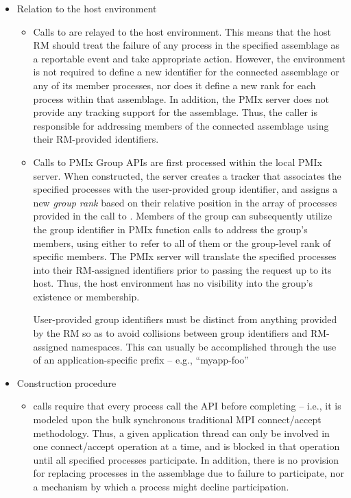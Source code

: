 \begin{itemize}
    \item Relation to the host environment
    \begin{itemize}
        \item Calls to  are relayed to the host environment. This means that the host \ac{RM} should treat the failure of any process in the specified assemblage as a reportable event and take appropriate action. However, the environment is not required to define a new identifier for the connected assemblage or any of its member processes, nor does it define a new rank for each process within that assemblage. In addition, the \ac{PMIx} server does not provide any tracking support for the assemblage. Thus, the caller is responsible for addressing members of the connected assemblage using their \ac{RM}-provided identifiers.

        \item Calls to \ac{PMIx} Group \acp{API} are first processed within the local \ac{PMIx} server. When constructed, the server creates a tracker that associates the specified processes with the user-provided group identifier, and assigns a new \emph{group rank} based on their relative position in the array of processes provided in the call to . Members of the group can subsequently utilize the group identifier in \ac{PMIx} function calls to address the group’s members, using either  to refer to all of them or the group-level rank of specific members. The \ac{PMIx} server will translate the specified processes into their \ac{RM}-assigned identifiers prior to passing the request up to its host. Thus, the host environment has no visibility into the group’s existence or membership.

\adviceuserstart
        User-provided group identifiers must be distinct from anything provided by the \ac{RM} so as to avoid collisions between group identifiers and \ac{RM}-assigned namespaces. This can usually be accomplished through the use of an application-specific prefix – e.g., ``myapp-foo''
\adviceuserend
    \end{itemize}
    \item Construction procedure
    \begin{itemize}
        \item {} calls require that every process call the \ac{API} before completing – i.e., it is modeled upon the bulk synchronous traditional \ac{MPI} connect/accept methodology. Thus, a given application thread can only be involved in one connect/accept operation at a time, and is blocked in that operation until all specified processes participate. In addition, there is no provision for replacing processes in the assemblage due to failure to participate, nor a mechanism by which a process might decline participation.


\end{itemize}
\end{itemize}
